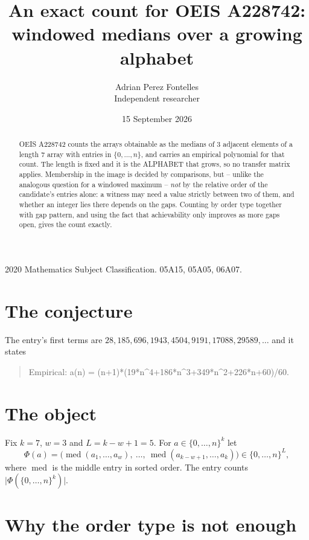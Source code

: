\documentclass[11pt,a4paper]{article}
\title{An exact count for OEIS A228742: windowed medians over a growing alphabet}
\author{Adrian Perez Fontelles\\ \small Independent researcher}
\date{15 September 2026}
\theoremstyle{plain}
\theoremstyle{definition}
\begin{document}
\maketitle

\begin{abstract}
OEIS A228742 counts the arrays obtainable as the medians of $3$ adjacent elements of a length
$7$ array with entries in $\{0,\dots,n\}$, and carries an empirical polynomial for that
count. The length is fixed and it is the ALPHABET that grows, so no transfer matrix applies.
Membership in the image is decided by comparisons, but -- unlike the analogous question for a
windowed maximum -- \emph{not} by the relative order of the candidate's entries alone: a
witness may need a value strictly between two of them, and whether an integer lies there depends
on the gaps. Counting by order type together with gap pattern, and using the fact that
achievability only improves as more gaps open, gives the count exactly.
\end{abstract}

\noindent\small 2020 Mathematics Subject Classification. 05A15, 05A05, 06A07.\normalsize

\section{The conjecture}

The entry's first terms are $28, 185, 696, 1943, 4504, 9191, 17088, 29589,\dots$ and it states

\begin{quote}\raggedright Empirical: a(n) = (n+1)*(19*n\^{}4+186*n\^{}3+349*n\^{}2+226*n+60)/60.\end{quote}

\section{The object}

Fix $k=7$, $w=3$ and $L=k-w+1=5$. For $a\in\{0,\dots,n\}^k$ let
\[
  \Phi(a)=\bigl(\operatorname{med}(a_1,\dots,a_w),\ \dots,\
  \operatorname{med}(a_{k-w+1},\dots,a_k)\bigr)\in\{0,\dots,n\}^{L} ,
\]
where $\operatorname{med}$ is the middle entry in sorted order. The entry counts
$\lvert\Phi(\{0,\dots,n\}^k)\rvert$.

\section{Why the order type is not enough}
\end{document}
